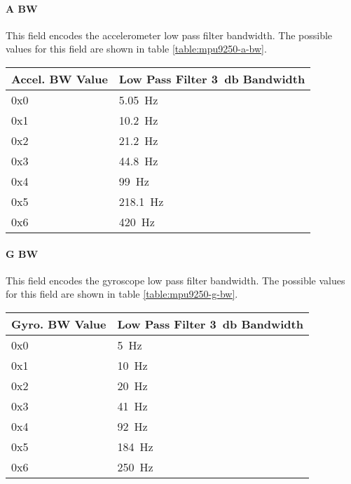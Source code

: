 \paragraph{A BW}
This field encodes the accelerometer low pass filter bandwidth. The possible
values for this field are shown in table \ref{table:mpu9250-a-bw}.

\begin{table*}[htb]
\centering
\begin{tabular}{@{}ll@{}}
\toprule
Accel. BW Value     &   Low Pass Filter \SI{3}{\decibel} Bandwidth \\
\midrule
0x0                 &   {\SI{5.05}{\hertz}} \\
0x1                 &   {\SI{10.2}{\hertz}} \\
0x2                 &   {\SI{21.2}{\hertz}} \\
0x3                 &   {\SI{44.8}{\hertz}} \\
0x4                 &   {\SI{99}{\hertz}} \\
0x5                 &   {\SI{218.1}{\hertz}} \\
0x6                 &   {\SI{420}{\hertz}} \\
\bottomrule
\end{tabular}
\caption{MPU9250 Accelerometer Low Pass Filter Bandwidth Values}
\label{table:mpu9250-a-bw}
\end{table*}

\paragraph{G BW}
This field encodes the gyroscope low pass filter bandwidth. The possible values
for this field are shown in table \ref{table:mpu9250-g-bw}.

\begin{table*}[htb]
\centering
\begin{tabular}{@{}ll@{}}
\toprule
Gyro. BW Value      &   Low Pass Filter \SI{3}{\decibel} Bandwidth \\
\midrule
0x0                 &   {\SI{5}{\hertz}} \\
0x1                 &   {\SI{10}{\hertz}} \\
0x2                 &   {\SI{20}{\hertz}} \\
0x3                 &   {\SI{41}{\hertz}} \\
0x4                 &   {\SI{92}{\hertz}} \\
0x5                 &   {\SI{184}{\hertz}} \\
0x6                 &   {\SI{250}{\hertz}} \\
\bottomrule
\end{tabular}
\caption{MPU9250 Gyroscope Low Pass Filter Bandwidth Values}
\label{table:mpu9250-g-bw}
\end{table*}

